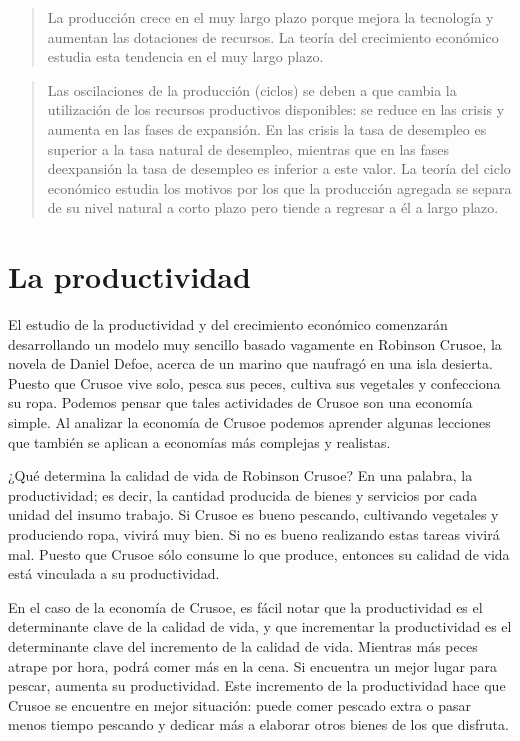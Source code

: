 \documentclass[
]{krantz}
\begin{document}
\begin{quote}
La producción crece en el muy largo plazo porque mejora la tecnología y aumentan las dotaciones de recursos. La teoría del crecimiento económico estudia esta tendencia en el muy largo plazo.
\end{quote}

\begin{quote}
Las oscilaciones de la producción (ciclos) se deben a que cambia la utilización de los recursos productivos disponibles: se reduce en las crisis y aumenta en las fases de expansión. En las crisis la tasa de desempleo es superior a la tasa natural de desempleo, mientras que en las fases deexpansión la tasa de desempleo es inferior a este valor. La teoría del ciclo económico estudia los motivos por los que la producción agregada se separa de su nivel natural a corto plazo pero tiende a regresar a él a largo plazo.
\end{quote}

\hypertarget{la-productividad}{%
\section{La productividad}\label{la-productividad}}

El estudio de la productividad y del crecimiento económico comenzarán desarrollando un modelo muy sencillo basado vagamente en Robinson Crusoe, la novela de Daniel Defoe, acerca de un marino que naufragó en una isla desierta. Puesto que Crusoe vive solo, pesca sus peces, cultiva sus vegetales y confecciona su ropa. Podemos pensar que tales actividades de Crusoe son una economía simple. Al analizar la economía de Crusoe podemos aprender algunas lecciones que también se aplican a economías más complejas y realistas.

¿Qué determina la calidad de vida de Robinson Crusoe? En una palabra, la productividad; es decir, la cantidad producida de bienes y servicios por cada unidad del insumo trabajo. Si Crusoe es bueno pescando, cultivando vegetales y produciendo ropa, vivirá muy bien. Si no es bueno realizando estas tareas vivirá mal. Puesto que Crusoe sólo consume lo que produce, entonces su calidad de vida está vinculada a su productividad.

En el caso de la economía de Crusoe, es fácil notar que la productividad es el determinante clave de la calidad de vida, y que incrementar la productividad es el determinante clave del incremento de la calidad de vida. Mientras más peces atrape por hora, podrá comer más en la cena. Si encuentra un mejor lugar para pescar, aumenta su productividad. Este incremento de la productividad hace que Crusoe se encuentre en mejor situación: puede comer pescado extra o pasar menos tiempo pescando y dedicar más a elaborar otros bienes de los que disfruta.
\end{document}
